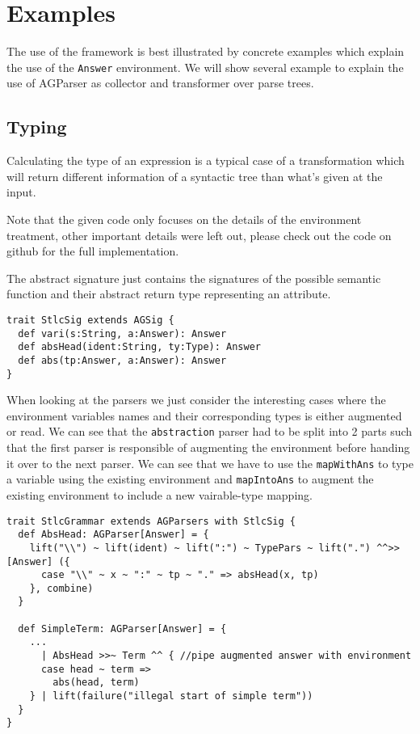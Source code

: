 \section{Examples}
The use of the framework is best illustrated by concrete examples which explain the use of the \verb/Answer/ environment. We will show several example to explain the use of AGParser as collector and transformer over parse trees.

\subsection{Typing}
Calculating the type of an expression is a typical case of a transformation which will return different information of a syntactic tree than what's given at the input.

Note that the given code only focuses on the details of the environment treatment, other important details were left out, please check out the code on github for the full implementation.

The abstract signature just contains the signatures of the possible semantic function and their abstract return type representing an attribute.
\begin{lstlisting}
trait StlcSig extends AGSig {
  def vari(s:String, a:Answer): Answer
  def absHead(ident:String, ty:Type): Answer
  def abs(tp:Answer, a:Answer): Answer
}
\end{lstlisting}

When looking at the parsers we just consider the interesting cases where the environment variables names and their corresponding types is either augmented or read. We can see that the \verb/abstraction/ parser had to be split into 2 parts such that the first parser is responsible of augmenting the environment before handing it over to the next parser.
We can see that we have to use the \verb/mapWithAns/ to type a variable using the existing environment and \verb/mapIntoAns/ to augment the existing environment to include a new vairable-type mapping.
\begin{lstlisting}
trait StlcGrammar extends AGParsers with StlcSig {
  def AbsHead: AGParser[Answer] = {
    lift("\\") ~ lift(ident) ~ lift(":") ~ TypePars ~ lift(".") ^^>>[Answer] ({
      case "\\" ~ x ~ ":" ~ tp ~ "." => absHead(x, tp)
    }, combine)
  }

  def SimpleTerm: AGParser[Answer] = {
    ...
      | AbsHead >>~ Term ^^ { //pipe augmented answer with environment
      case head ~ term =>
        abs(head, term)
    } | lift(failure("illegal start of simple term"))
  }
}
\end{lstlisting}

